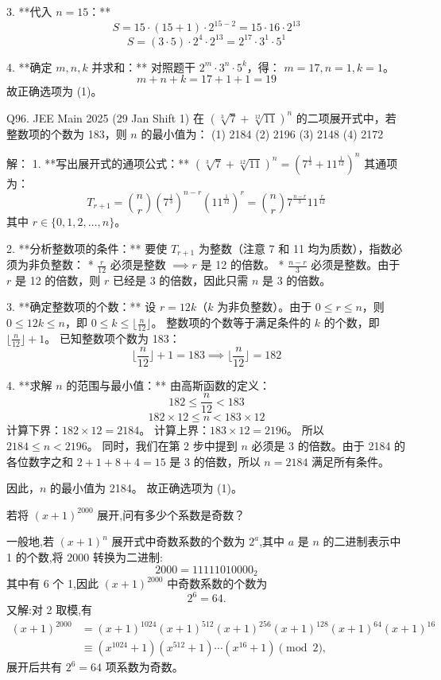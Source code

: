 \begin{questions}
\begin{solution}
3. **代入 $n = 15$：**
\[ S = 15 \cdot (15+1) \cdot 2^{15-2} = 15 \cdot 16 \cdot 2^{13} \]
\[ S = (3 \cdot 5) \cdot 2^4 \cdot 2^{13} = 2^{17} \cdot 3^1 \cdot 5^1 \]

4. **确定 $m, n, k$ 并求和：**
对照题干 $2^m \cdot 3^n \cdot 5^k$，得：
$m = 17, n = 1, k = 1$。
\[ m + n + k = 17 + 1 + 1 = 19 \]
故正确选项为 (1)。
\end{solution}

\question Q96. JEE Main 2025 (29 Jan Shift 1)
在 $(\sqrt[3]{7} + \sqrt[12]{11})^n$ 的二项展开式中，若整数项的个数为 183，则 $n$ 的最小值为：
(1) 2184 \quad (2) 2196 \quad (3) 2148 \quad (4) 2172

\begin{solution}
解：
1. **写出展开式的通项公式：**
$(\sqrt[3]{7} + \sqrt[12]{11})^n = (7^{\frac{1}{3}} + 11^{\frac{1}{12}})^n$
其通项为：
\[ T_{r+1} = \binom{n}{r} (7^{\frac{1}{3}})^{n-r} (11^{\frac{1}{12}})^r = \binom{n}{r} 7^{\frac{n-r}{3}} 11^{\frac{r}{12}} \]
其中 $r \in \{0, 1, 2, \dots, n\}$。

2. **分析整数项的条件：**
要使 $T_{r+1}$ 为整数（注意 7 和 11 均为质数），指数必须为非负整数：
* $\frac{r}{12}$ 必须是整数 $\implies r$ 是 12 的倍数。
* $\frac{n-r}{3}$ 必须是整数。由于 $r$ 是 12 的倍数，则 $r$ 已经是 3 的倍数，因此只需 $n$ 是 3 的倍数。

3. **确定整数项的个数：**
设 $r = 12k$（$k$ 为非负整数）。由于 $0 \leq r \leq n$，则 $0 \leq 12k \leq n$，即 $0 \leq k \leq \lfloor \frac{n}{12} \rfloor$。
整数项的个数等于满足条件的 $k$ 的个数，即 $\lfloor \frac{n}{12} \rfloor + 1$。
已知整数项个数为 183：
\[ \lfloor \frac{n}{12} \rfloor + 1 = 183 \implies \lfloor \frac{n}{12} \rfloor = 182 \]

4. **求解 $n$ 的范围与最小值：**
由高斯函数的定义：
\[ 182 \leq \frac{n}{12} < 183 \]
\[ 182 \times 12 \leq n < 183 \times 12 \]
计算下界：$182 \times 12 = 2184$。
计算上界：$183 \times 12 = 2196$。
所以 $2184 \leq n < 2196$。
同时，我们在第 2 步中提到 $n$ 必须是 3 的倍数。由于 2184 的各位数字之和 $2+1+8+4 = 15$ 是 3 的倍数，所以 $n=2184$ 满足所有条件。

因此，$n$ 的最小值为 2184。
故正确选项为 (1)。
\end{solution}

    \question 若将 $(x+1)^{2000}$ 展开,问有多少个系数是奇数？
    \begin{solution}
        一般地,若 $(x+1)^n$ 展开式中奇数系数的个数为 $2^{a}$,其中 $a$ 是 $n$ 的二进制表示中 1 的个数,将 $2000$ 转换为二进制:
        \[
        2000 = 11111010000_2
        \]
        其中有 6 个 1,因此 $(x+1)^{2000}$ 中奇数系数的个数为
        \[
        2^6 = 64.
        \]
        又解:对 2 取模,有
        \begin{align*}
        (x+1)^{2000} 
        &= (x+1)^{1024}(x+1)^{512}(x+1)^{256}(x+1)^{128}(x+1)^{64}(x+1)^{16} \\
        &\equiv (x^{1024}+1)(x^{512}+1)\cdots(x^{16}+1) \pmod{2},
        \end{align*}
        展开后共有 $2^6=64$ 项系数为奇数。
    \end{solution}


\end{questions}
